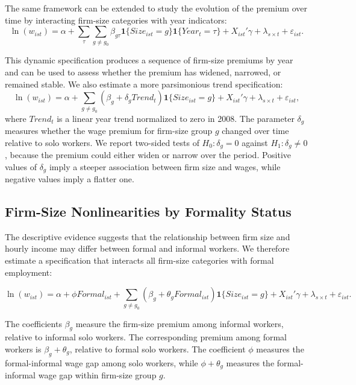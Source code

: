 The same framework can be extended to study the evolution of the premium over time by interacting firm-size categories with year indicators:
\begin{equation}
  \ln(w_{ist}) =
  \alpha
  + \sum_{\tau}\sum_{g \neq g_0}
    \beta_{g\tau}\mathbf{1}\{Size_{ist}=g\}\mathbf{1}\{Year_{t}=\tau\}
  + X_{ist}'\gamma
  + \lambda_{s \times t}
  + \varepsilon_{ist}.    
\end{equation}

This dynamic specification produces a sequence of firm-size premiums by year and can be used to assess whether the premium has widened, narrowed, or remained stable. We also estimate a more parsimonious trend specification:
\begin{equation}
  \ln(w_{ist}) =
  \alpha
  + \sum_{g \neq g_0} \left(\beta_g
  +  \delta_g
    Trend_t\right)\mathbf{1}\{Size_{ist}=g\}
  + X_{ist}'\gamma
  + \lambda_{s \times t}
  + \varepsilon_{ist},
\end{equation}
where \(Trend_t\) is a linear year trend normalized to zero in 2008. The parameter \(\delta_g\) measures whether the wage premium for firm-size group \(g\) changed over time relative to solo workers. We report two-sided tests of \(H_0:\delta_g=0\) against \(H_1:\delta_g\neq0\), because the premium could either widen or narrow over the period. Positive values of \(\delta_g\) imply a steeper association between firm size and wages, while negative values imply a flatter one.


\subsection{Firm-Size Nonlinearities by Formality Status}

The descriptive evidence suggests that the relationship between firm size and
hourly income may differ between formal and informal workers. We therefore
estimate a specification that interacts all firm-size categories with formal
employment:

\begin{equation}\label{eq:formality-interaction}
  \ln(w_{ist}) =
  \alpha
  + \phi Formal_{ist}
  + \sum_{g \neq g_0} \left(\beta_g 
  + \theta_g
     Formal_{ist}\right)\mathbf{1}\{Size_{ist}=g\}
  + X_{ist}'\gamma
  + \lambda_{s \times t}
  + \varepsilon_{ist}.    
\end{equation}

The coefficients \(\beta_g\) measure the firm-size premium among informal workers, relative to informal solo workers. The corresponding premium among formal workers is \(\beta_g+\theta_g\), relative to formal solo workers. The coefficient \(\phi\) measures the formal-informal wage gap among solo workers, while \(\phi+\theta_g\) measures the formal-informal wage gap within firm-size group \(g\).

